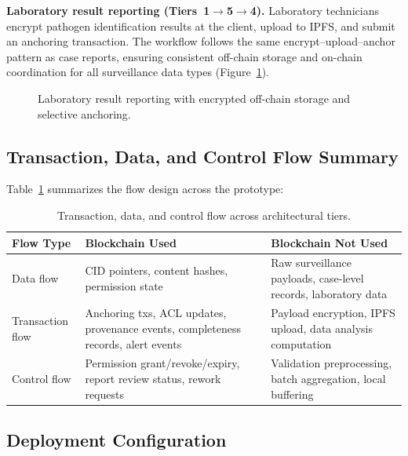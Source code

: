 \documentclass[AMA,LATO1COL]{WileyNJD-v2}
\begin{document}
\textbf{Laboratory result reporting (Tiers~1$\rightarrow$5$\rightarrow$4).} Laboratory technicians encrypt pathogen identification results at the client, upload to IPFS, and submit an anchoring transaction. The workflow follows the same encrypt--upload--anchor pattern as case reports, ensuring consistent off-chain storage and on-chain coordination for all surveillance data types (Figure~\ref{fig:lab}).

\begin{figure}[!ht]
\centering
{}
\caption{Laboratory result reporting with encrypted off-chain storage and selective anchoring.}\label{fig:lab}
\end{figure}

\subsection{Transaction, Data, and Control Flow Summary}\label{subsec:flow_summary}

Table~\ref{tab:flow} summarizes the flow design across the prototype:

\begin{table}[!ht]
\caption{Transaction, data, and control flow across architectural tiers.}\label{tab:flow}
\centering
\small
\begin{tabular}{p{2.2cm}p{2.5cm}p{2.8cm}}
\toprule
\textbf{Flow Type} & \textbf{Blockchain Used} & \textbf{Blockchain Not Used} \\
\midrule
Data flow & CID pointers, content hashes, permission state & Raw surveillance payloads, case-level records, laboratory data \\
\midrule
Transaction flow & Anchoring txs, ACL updates, provenance events, completeness records, alert events & Payload encryption, IPFS upload, data analysis computation \\
\midrule
Control flow & Permission grant/revoke/expiry, report review status, rework requests & Validation preprocessing, batch aggregation, local buffering \\
\bottomrule
\end{tabular}
\end{table}

\subsection{Deployment Configuration}\label{subsec:deployment}
\end{document}
